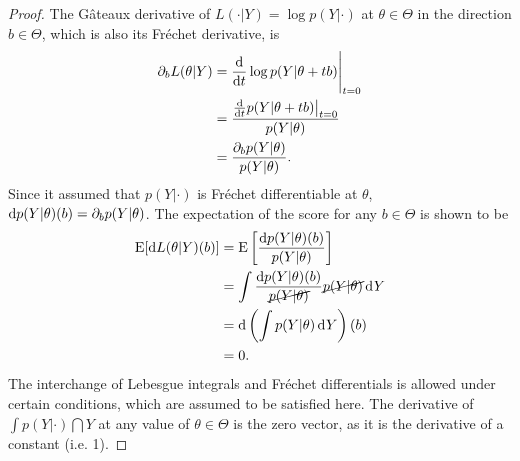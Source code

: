 \begin{proof}
  


The Gâteaux derivative of $L(\cdot|Y) = \log p(Y|\cdot)$ at $\theta\in\Theta$ in the direction $b\in\Theta$, which is also its Fréchet derivative, is
\begin{align*}
  \partial_b L(\theta|Y) 
  &= \frac{\text{d}}{\text{d} t} \log p(Y|\theta + tb) \Bigg|_{t=0} \\
  &= \frac{\frac{\text{d}}{\text{d} t}p(Y|\theta + tb)\big|_{t=0}}{p(Y|\theta)} \\
  &= \frac{\partial_b p(Y|\theta)}{p(Y|\theta)}.
\end{align*}
Since it assumed that $p(Y|\cdot)$ is Fréchet differentiable at $\theta$, $\text{d} p(Y|\theta)(b) = \partial_b p(Y|\theta)$.
The expectation of the score for any $b\in\Theta$ is shown to be
\begin{align*}
  \operatorname{E}[\text{d} L(\theta|Y)(b)] 
  &= \operatorname{E} \left[ \frac{\text{d} p(Y|\theta)(b)}{p(Y|\theta)} \right] \\
  &= \int \frac{\text{d} p(Y|\theta)(b)}{\cancel{p(Y|\theta)}} \cancel{p(Y|\theta)} \operatorname{d}\hspace{0.5pt}\! Y \\
  &= \text{d} \left(\int p(Y|\theta) \operatorname{d}\hspace{0.5pt}\! Y \right)(b) \\
  &=0.
\end{align*}
The interchange of Lebesgue integrals and Fréchet differentials is allowed under certain conditions\footnotemark, which are assumed to be satisfied here.
The derivative of $\int p(Y|\cdot)\dint Y$ at any value of $\theta\in\Theta$ is the zero vector, as it is the derivative of a constant (i.e. 1).


\end{proof}
